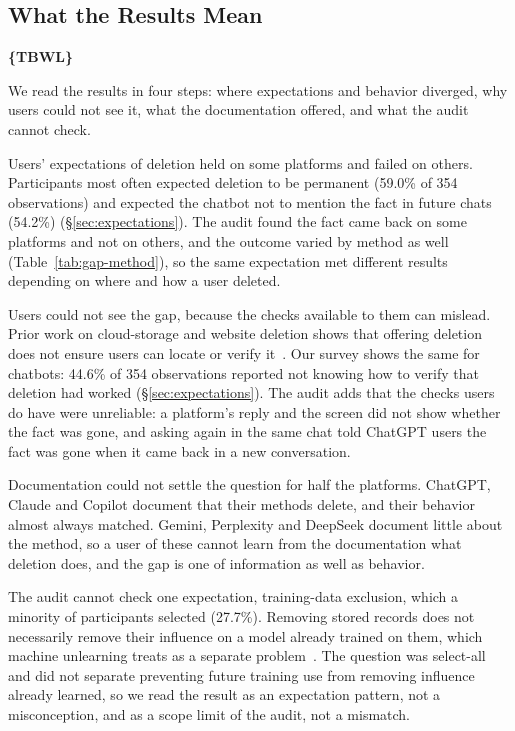 \documentclass[conference,compsoc]{IEEEtran}
\begin{document}
\subsection{What the Results Mean}
\label{sec:discussion-results}
\textbf{\{TBWL\}}

We read the results in four steps: where expectations and behavior diverged, why users could not see it, what the documentation offered, and what the audit cannot check.

Users' expectations of deletion held on some platforms and failed on others.
Participants most often expected deletion to be permanent (59.0\% of 354 observations) and expected the chatbot not to mention the fact in future chats (54.2\%) (\S\ref{sec:expectations}).
The audit found the fact came back on some platforms and not on others, and the outcome varied by method as well (Table~\ref{tab:gap-method}), so the same expectation met different results depending on where and how a user deleted.

Users could not see the gap, because the checks available to them can mislead.
Prior work on cloud-storage and website deletion shows that offering deletion does not ensure users can locate or verify it~\cite{ramokapane2017stupid,habib2019empirical}.
Our survey shows the same for chatbots: 44.6\% of 354 observations reported not knowing how to verify that deletion had worked (\S\ref{sec:expectations}).
The audit adds that the checks users do have were unreliable: a platform's reply and the screen did not show whether the fact was gone, and asking again in the same chat told ChatGPT users the fact was gone when it came back in a new conversation.

Documentation could not settle the question for half the platforms.
ChatGPT, Claude and Copilot document that their methods delete, and their behavior almost always matched.
Gemini, Perplexity and DeepSeek document little about the method, so a user of these cannot learn from the documentation what deletion does, and the gap is one of information as well as behavior.

The audit cannot check one expectation, training-data exclusion, which a minority of participants selected (27.7\%).
Removing stored records does not necessarily remove their influence on a model already trained on them, which machine unlearning treats as a separate problem~\cite{bourtoule2021machine}.
The question was select-all and did not separate preventing future training use from removing influence already learned, so we read the result as an expectation pattern, not a misconception, and as a scope limit of the audit, not a mismatch.
\end{document}
